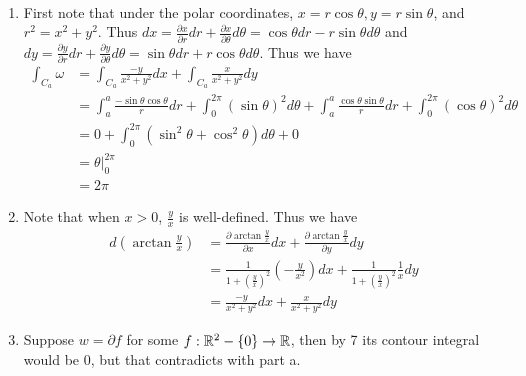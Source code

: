 \documentclass[12pt]{article}
\begin{document}
\begin{problem}[4.4.8]
~\begin{enumerate}[label=(\alph*)]
	\item First note that under the polar coordinates, $ x = r \cos \theta, y = r \sin \theta$, and $ r^2 = x^2 + y^2$. Thus $ dx = \frac{\partial x}{\partial r} dr + \frac{\partial x}{\partial \theta} d \theta  = \cos \theta dr - r \sin \theta d \theta $ and $ dy = \frac{\partial y}{\partial r} dr + \frac{\partial y}{\partial \theta} d \theta = \sin \theta dr + r \cos \theta d \theta $. Thus we have
\begin{align*}
	\int_{C_a} \omega &= \int_{C_a} \frac{-y}{ x^2+y^2} dx + \int_{C_a} \frac{x}{ x^2+y^2} dy\\
	&= \int_{a}^{a} \frac{- \sin \theta \cos \theta}{ r} dr + \int_{0}^{2 \pi} (\sin \theta)^2 d \theta + \int_{ a}^{ a} \frac{ \cos \theta \sin \theta }{ r} dr + \int_{ 0}^{ 2\pi} (\cos \theta)^2 d \theta \\
	&= 0+ \int_{ 0}^{ 2 \pi} (\sin^2 \theta + \cos^2 \theta) d \theta  + 0  \\
	&= \theta|_{0}^{2\pi} \\
	&= 2 \pi
\end{align*}
\item Note that when $ x > 0$,  $ \frac{y}{x}$ is well-defined. Thus we have
	\begin{align*}
		d \left( \arctan \frac{y}{x}\right) &=  \frac{\partial \arctan \frac{y}{x}}{\partial x} dx + \frac{\partial \arctan \frac{y}{x}}{\partial y} dy \\
		&= \frac{1}{1+\left( \frac{y}{x} \right)^2 } \left( - \frac{y}{x^2} \right) dx + \frac{1}{1+ \left( \frac{y}{x} \right) ^2} \frac{1}{x} dy\\
		&= \frac{-y}{ x^2+y^2} dx + \frac{x}{ x^2+y^2} dy 
	\end{align*}
\item Suppose $ w = \partial f$ for some $ f: \mathbb{R}^2 - \{0\} \to \mathbb{R}$, then by 7 its contour integral would be 0, but that contradicts with part a.
\end{enumerate}
\end{problem}
\end{document}
